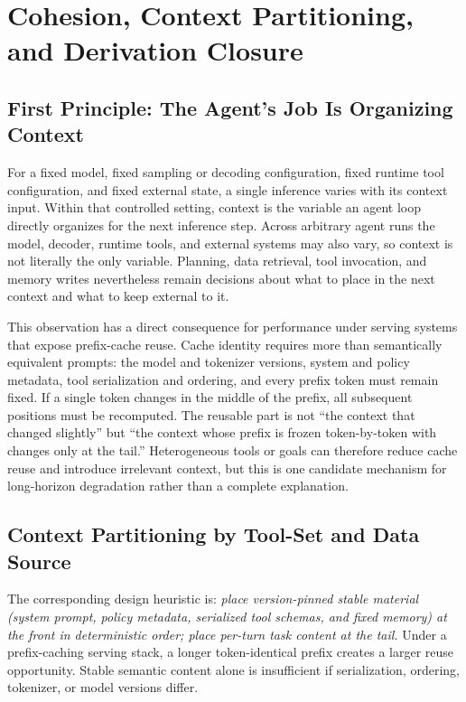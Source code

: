 \documentclass[11pt]{article}
\begin{document}
\section{Cohesion, Context Partitioning, and Derivation Closure}
\label{sec:cohesion}

\subsection{First Principle: The Agent's Job Is Organizing Context}
\label{sec:first-principle}

For a fixed model, fixed sampling or decoding configuration, fixed runtime tool configuration, and fixed external state, a single inference varies with its context input. Within that controlled setting, context is the variable an agent loop directly organizes for the next inference step. Across arbitrary agent runs the model, decoder, runtime tools, and external systems may also vary, so context is not literally the only variable. Planning, data retrieval, tool invocation, and memory writes nevertheless remain decisions about what to place in the next context and what to keep external to it.

This observation has a direct consequence for performance under serving systems that expose prefix-cache reuse. Cache identity requires more than semantically equivalent prompts: the model and tokenizer versions, system and policy metadata, tool serialization and ordering, and every prefix token must remain fixed. If a single token changes in the middle of the prefix, all subsequent positions must be recomputed. The reusable part is not ``the context that changed slightly'' but ``the context whose prefix is frozen token-by-token with changes only at the tail.'' Heterogeneous tools or goals can therefore reduce cache reuse and introduce irrelevant context, but this is one candidate mechanism for long-horizon degradation rather than a complete explanation.

\subsection{Context Partitioning by Tool-Set and Data Source}

The corresponding design heuristic is: \textit{place version-pinned stable material (system prompt, policy metadata, serialized tool schemas, and fixed memory) at the front in deterministic order; place per-turn task content at the tail.} Under a prefix-caching serving stack, a longer token-identical prefix creates a larger reuse opportunity. Stable semantic content alone is insufficient if serialization, ordering, tokenizer, or model versions differ.
\end{document}
